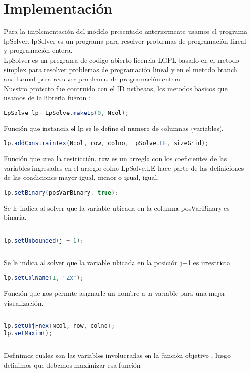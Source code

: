 \documentclass[10pt]{article}
\begin{document}
\section{Implementaci\'on}

Para la implementaci\'on del modelo presentado anteriormente usamos el programa lpSolver, lpSolver es un programa para resolver problemas de programación lineal y programación entera.\\

LpSolver es un programa de codigo abierto licencia LGPL basado en el metodo simplex para resolver problemas de programación lineal y en el metodo branch and bound para  resolver problemas de programaci\'on entera.\\

Nuestro protecto fue contruido con el ID netbeans,  los metodos basicos que usamos de la libreria  fueron : 


\begin{lstlisting}[language=Java]
LpSolve lp= LpSolve.makeLp(0, Ncol);
\end{lstlisting}

Funci\'on que instancia el lp se le define el numero de columnas (variables). 


\begin{lstlisting}[language=Java]
lp.addConstraintex(Ncol, row, colno, LpSolve.LE, sizeGrid);
\end{lstlisting}
Funci\'on que crea la restricci\'on, row es un arreglo con los coeficientes de las variables ingresadas en el arreglo colno   LpSolve.LE hace parte de las definiciones de las condiciones mayor igual, menor o igual, igual.

\begin{lstlisting}[language=Java]
lp.setBinary(posVarBinary, true);
\end{lstlisting}
Se le indica al solver que la variable ubicada en la columna posVarBinary es binaria.

\begin{lstlisting}[language=Java]

lp.setUnbounded(j + 1);
  
\end{lstlisting}

Se le indica al solver que la variable ubicada en la posici\'on j+1 es irrestricta

\begin{lstlisting}[language=Java]
lp.setColName(1, "Zx");
\end{lstlisting}
Funci\'on que nos permite asignarle un nombre a la variable para una mejor visualizaci\'on.


\begin{lstlisting}[language=Java]

lp.setObjFnex(Ncol, row, colno);
lp.setMaxim();	
	
\end{lstlisting}
Definimos cuales son las variables involucradas en la funci\'on objetivo , luego  definimos que debemos maximizar esa funci\'on
\end{document}
